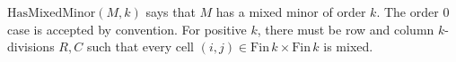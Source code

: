\(\mathrm{HasMixedMinor}(M,k)\) says that \(M\) has a mixed minor of order
\(k\).  The order \(0\) case is accepted by convention.  For positive \(k\),
there must be row and column \(k\)-divisions \(R,C\) such that every cell
\((i,j)\in \mathrm{Fin}\,k\times\mathrm{Fin}\,k\) is mixed.
